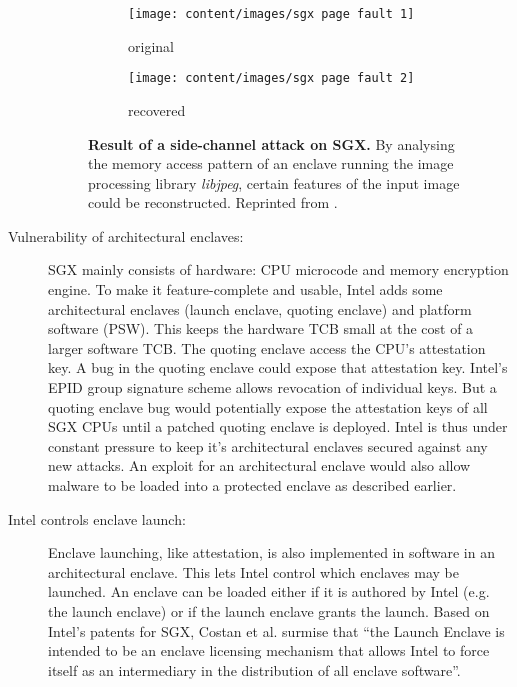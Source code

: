 \begin{description}
\begin{figure}[H]
\begin{center}
	\begin{subfigure}[b]{0.4\textwidth}
		\texttt{[image: content/images/sgx page fault 1]}
		\caption{original\label{ID_508330768}}
	\end{subfigure}
	\begin{subfigure}[b]{0.4\textwidth}
		\texttt{[image: content/images/sgx page fault 2]}
		\caption{recovered\label{ID_105623928}}
	\end{subfigure}
	\caption{\textbf{Result of a side-channel attack on SGX.} By analysing the memory access pattern of an enclave running the image processing library \textit{libjpeg}, certain features of the input image could be reconstructed. Reprinted from \cite{Xu2015}.\label{ID_172988213}}
	\end{center}
\end{figure}

\item[Vulnerability of architectural enclaves:]\label{ID_782196997}
SGX mainly consists of hardware: CPU microcode and memory encryption engine.\label{ID_1187633218}
To make it feature-complete and usable, Intel adds some architectural enclaves (launch enclave, quoting enclave) and platform software (PSW).\label{ID_306094396}
This keeps the hardware TCB small at the cost of a larger software TCB.\label{ID_119641221}
The quoting enclave access the CPU's attestation key.\label{ID_321415880}
A bug in the quoting enclave could expose that attestation key.\label{ID_1321164653}
Intel's EPID group signature scheme allows revocation of individual keys. But a quoting enclave bug would potentially expose the attestation keys of all SGX CPUs until a patched quoting enclave is deployed.\cite[]{c}\label{ID_1629332890}
Intel is thus under constant pressure to keep it's architectural enclaves secured against any new attacks.\label{ID_1159889792}
An exploit for an architectural enclave would also allow malware to be loaded into a protected enclave as described earlier.\label{ID_1914496271}
\item[Intel controls enclave launch:]\label{ID_27203074}
Enclave launching, like attestation, is also implemented in software in an architectural enclave.\label{ID_149498049}
This lets Intel control which enclaves may be launched.\label{ID_1496527821}
An enclave can be loaded either if it is authored by Intel (e.g. the launch enclave) or if the launch enclave grants the launch.\label{ID_1663962426}
Based on Intel's patents for SGX, Costan et al. surmise that ``the Launch Enclave is intended to be an enclave licensing mechanism that allows Intel to force itself as an intermediary in the distribution of all enclave software''.\cite[]{sgx-explained}\label{ID_520209509}


\end{description}
